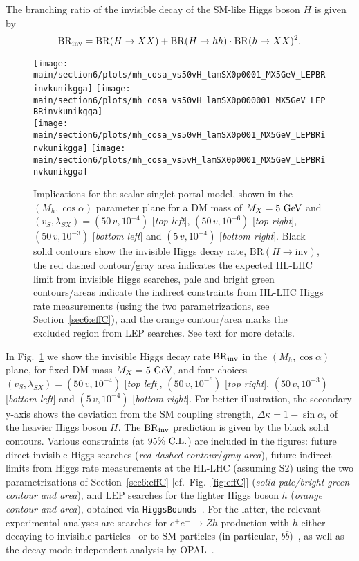 \documentclass[../report.tex]{subfiles}
\providecommand{\main}{..}
\begin{document}
The branching ratio of the invisible decay of the SM-like Higgs boson $H$ is given by
\begin{align}
\BRHinv = \mathrm{BR}(H\to XX) + \mathrm{BR}(H\to hh) \cdot \mathrm{BR}(h\to XX)^2.
\end{align}
 
\begin{figure}[t]
\centering
\texttt{[image: \\main/section6/plots/mh\_cosa\_vs50vH\_lamSX0p0001\_MX5GeV\_LEPBRinvkunikgga]}\hfill
\texttt{[image: \\main/section6/plots/mh\_cosa\_vs50vH\_lamSX0p000001\_MX5GeV\_LEPBRinvkunikgga]}\\
\texttt{[image: \\main/section6/plots/mh\_cosa\_vs50vH\_lamSX0p001\_MX5GeV\_LEPBRinvkunikgga]}\hfill
\texttt{[image: \\main/section6/plots/mh\_cosa\_vs5vH\_lamSX0p0001\_MX5GeV\_LEPBRinvkunikgga]}
\caption{Implications for the scalar singlet portal model, shown in the $(M_h, \cos\alpha)$ parameter plane for a DM mass of $M_X = 5~\text{GeV}$ and $(v_S, \lambda_{SX}) = (50\,v, 10^{-4})$ [\emph{top left}], $(50\,v, 10^{-6})$ [\emph{top right}], $(50\,v, 10^{-3})$ [\emph{bottom left}] and $(5\,v, 10^{-4})$ [\emph{bottom right}]. Black solid contours show the invisible Higgs decay rate, $\mathrm{BR}(H\to \mathrm{inv})$, the red dashed contour/gray area indicates the expected HL-LHC limit from invisible Higgs searches, pale and bright green contours/areas indicate the indirect constraints from HL-LHC Higgs rate measurements (using the two parametrizations, see Section~\ref{sec6:effC}), and the orange contour/area marks the excluded region from LEP searches. See text for more details.}
\label{Fig:singletportal}
\end{figure}
 
 In Fig.~\ref{Fig:singletportal} we show the invisible Higgs decay rate $\mathrm{BR}_\mathrm{inv}$ in the $(M_h, \cos\alpha)$ plane, for fixed DM mass $M_X = 5~\text{GeV}$, and four choices $(v_S, \lambda_{SX}) = (50\,v, 10^{-4})$ [\emph{top left}], $(50\,v, 10^{-6})$ [\emph{top right}], $(50\,v, 10^{-3})$ [\emph{bottom left}] and $(5\,v, 10^{-4})$ [\emph{bottom right}]. For better illustration, the secondary y-axis shows the deviation from the SM coupling strength, $\Delta \kappa = 1 -\sin\alpha$, of the heavier Higgs boson $H$. The $\mathrm{BR}_\mathrm{inv}$ prediction is given by the black solid contours. Various constraints (at $95\%~\mathrm{C.L.}$) are included in the figures: future direct invisible Higgs searches (\emph{red dashed contour}/\emph{gray area}), future indirect limits from Higgs rate measurements {at the HL-LHC (assuming S2)} using the two parametrizations of Section~\ref{sec6:effC} [cf.~Fig.~\ref{fig:effC}] (\emph{solid pale/bright green contour and area}), and LEP searches for the lighter Higgs boson $h$ (\emph{orange contour and area}), obtained via \texttt{HiggsBounds}~\cite{Bechtle:2008jh,Bechtle:2011sb,Bechtle:2013wla}. For the latter, the relevant experimental analyses are searches for $e^+e^-\to Zh$ production with $h$ either decaying to invisible particles~\cite{Searches:2001ab,Abdallah:2003ry,Achard:2004cf,Abbiendi:2007ac} or to SM particles (in particular, $b\bar{b}$)~\cite{Schael:2006cr}, as well as the decay mode independent analysis by OPAL~\cite{Abbiendi:2002qp}.
\end{document}
